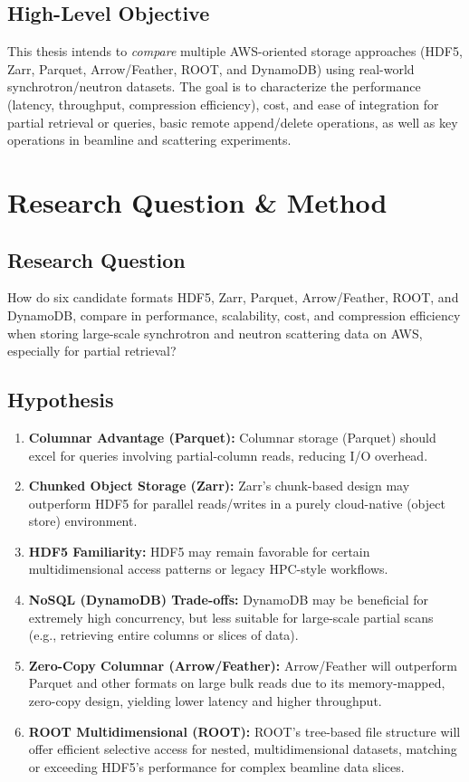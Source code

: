\documentclass{article}
\begin{document}
\subsection{High-Level Objective}
This thesis intends to \emph{compare} multiple AWS-oriented storage approaches (HDF5, Zarr, Parquet, Arrow/Feather, ROOT, and DynamoDB) using real-world synchrotron/neutron datasets. The goal is to characterize the performance (latency, throughput, compression efficiency), cost, and ease of integration for partial retrieval or queries, basic remote append/delete operations, as well as key operations in beamline and scattering experiments.






\section{Research Question \& Method}

\subsection{Research Question}
How do six candidate formats HDF5, Zarr, Parquet, Arrow/Feather, ROOT, and DynamoDB, compare in performance, scalability, cost, and compression efficiency when storing large-scale synchrotron and neutron scattering data on AWS, especially for partial retrieval?


\subsection{Hypothesis}
\begin{enumerate}
    \item \textbf{Columnar Advantage (Parquet):} Columnar storage (Parquet) should excel for queries involving partial-column reads, reducing I/O overhead.
    \item \textbf{Chunked Object Storage (Zarr):} Zarr’s chunk-based design may outperform HDF5 for parallel reads/writes in a purely cloud-native (object store) environment.
    \item \textbf{HDF5 Familiarity:} HDF5 may remain favorable for certain multidimensional access patterns or legacy HPC-style workflows.
    \item \textbf{NoSQL (DynamoDB) Trade-offs:} DynamoDB may be beneficial for extremely high concurrency, but less suitable for large-scale partial scans (e.g., retrieving entire columns or slices of data).
    \item \textbf{Zero-Copy Columnar (Arrow/Feather):} Arrow/Feather will outperform Parquet and other formats on large bulk reads due to its memory-mapped, zero-copy design, yielding lower latency and higher throughput.
    \item \textbf{ROOT Multidimensional (ROOT):} ROOT’s tree-based file structure will offer efficient selective access for nested, multidimensional datasets, matching or exceeding HDF5’s performance for complex beamline data slices.

\end{enumerate}
\end{document}
